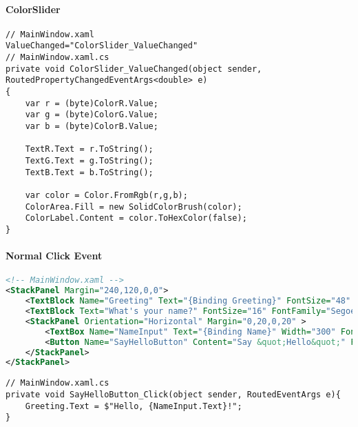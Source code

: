 \paragraph{ColorSlider}
\begin{lstlisting}
// MainWindow.xaml
ValueChanged="ColorSlider_ValueChanged"
// MainWindow.xaml.cs
private void ColorSlider_ValueChanged(object sender, RoutedPropertyChangedEventArgs<double> e)
{
	var r = (byte)ColorR.Value;
	var g = (byte)ColorG.Value;
	var b = (byte)ColorB.Value;

	TextR.Text = r.ToString();
	TextG.Text = g.ToString();
	TextB.Text = b.ToString();
	
	var color = Color.FromRgb(r,g,b);
	ColorArea.Fill = new SolidColorBrush(color);
	ColorLabel.Content = color.ToHexColor(false);
}
\end{lstlisting}
\paragraph{Normal Click Event}
\begin{lstlisting}[language=xml]
<!-- MainWindow.xaml -->
<StackPanel Margin="240,120,0,0">
	<TextBlock Name="Greeting" Text="{Binding Greeting}" FontSize="48" FontFamily="Segoe UI Light"   Margin="0,0,0,40" />
	<TextBlock Text="What's your name?" FontSize="16" FontFamily="Segoe UI Light" />
	<StackPanel Orientation="Horizontal" Margin="0,20,0,20" >
		<TextBox Name="NameInput" Text="{Binding Name}" Width="300" FontSize="16" 		 VerticalContentAlignment="Center" FontFamily="Segoe UI" BorderThickness="0" 		 HorizontalAlignment="Left" Margin="0,0,10,0"/>
		<Button Name="SayHelloButton" Content="Say &quot;Hello&quot;" FontSize="16" FontFamily="Segoe UI Light" 	Background="#0065A3" BorderThickness="2" BorderBrush="White" Foreground="White" 	Padding="4" IsDefault="True" Click="SayHelloButton_Click" />
	</StackPanel>
</StackPanel>
\end{lstlisting}
\begin{lstlisting}
// MainWindow.xaml.cs
private void SayHelloButton_Click(object sender, RoutedEventArgs e){
	Greeting.Text = $"Hello, {NameInput.Text}!";
}
\end{lstlisting}

